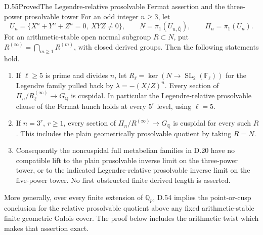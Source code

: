 \begin{statement}{D.55}{Proved}{The Legendre-relative prosolvable Fermat assertion and the three-power prosolvable tower}
For an odd integer \(n\ge3\), let
\[
 U_n=\{X^n+Y^n+Z^n=0,\ XYZ\ne0\},\qquad
 N=\pi_1(U_{n,\overline{\mathbb Q}}),\qquad
 \Pi_n=\pi_1(U_n).
\]
For an arithmetic-stable open normal subgroup \(R\subset N\), put
\(R^{(\infty)}=\bigcap_{m\ge1}R^{(m)}\), with closed derived groups.
Then the following statements hold.
\begin{enumerate}
\item If \(\ell\ge5\) is prime and divides \(n\), let
\(R_\ell=\ker(N\to\operatorname{SL}_2(\mathbb F_\ell))\)
for the Legendre family pulled back by \(\lambda=-(X/Z)^n\).
Every section of \(\Pi_n/R_\ell^{(\infty)}\to G_{\mathbb Q}\)
is cuspidal.  In particular the Legendre-relative prosolvable
clause of the Fermat hunch holds at every \(5^r\) level, using
\(\ell=5\).
\item If \(n=3^r\), \(r\ge1\), every section of
\(\Pi_n/R^{(\infty)}\to G_{\mathbb Q}\) is cuspidal for every
such \(R\).  This includes the plain geometrically prosolvable
quotient by taking \(R=N\).
\item Consequently the noncuspidal full metabelian families in
D.20 have no compatible lift to the plain prosolvable inverse
limit on the three-power tower, or to the indicated
Legendre-relative prosolvable inverse limit on the five-power
tower.  No first obstructed finite derived length is asserted.
\end{enumerate}
More generally, over every finite extension of \(\mathbb Q_p\),
D.54 implies the point-or-cusp conclusion for the relative
prosolvable quotient above any fixed arithmetic-stable finite
geometric Galois cover.  The proof below includes the arithmetic
twist which makes that assertion exact.
\end{statement}
